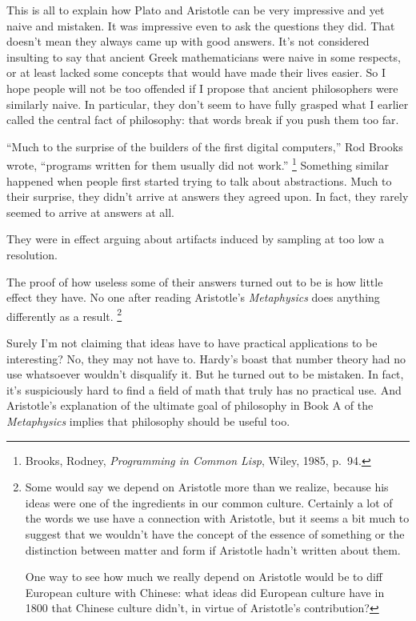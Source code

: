 \documentclass[12pt]{book}
\begin{document}
This is all to explain how Plato and Aristotle can be very impressive
and yet naive and mistaken. It was impressive even to ask the questions
they did. That doesn't mean they always came up with good answers. It's
not considered insulting to say that ancient Greek mathematicians were
naive in some respects, or at least lacked some concepts that would have
made their lives easier. So I hope people will not be too offended if I
propose that ancient philosophers were similarly naive. In particular,
they don't seem to have fully grasped what I earlier called the central
fact of philosophy: that words break if you push them too far.

``Much to the surprise of the builders of the first digital computers,''
Rod Brooks wrote, ``programs written for them usually did not work.''
\footnote{Brooks, Rodney, \emph{Programming in Common Lisp}, Wiley, 1985,
p.~94.} Something similar happened when people first
started trying to talk about abstractions. Much to their surprise, they
didn't arrive at answers they agreed upon. In fact, they rarely seemed
to arrive at answers at all.

They were in effect arguing about artifacts induced by sampling at too
low a resolution.

The proof of how useless some of their answers turned out to be is how
little effect they have. No one after reading Aristotle's
\emph{Metaphysics} does anything differently as a result.
\footnote{Some would say we depend on Aristotle more than we realize,
because his ideas were one of the ingredients in our common culture.
Certainly a lot of the words we use have a connection with Aristotle,
but it seems a bit much to suggest that we wouldn't have the concept of
the essence of something or the distinction between matter and form if
Aristotle hadn't written about them.

One way to see how much we really depend on Aristotle would be to diff
European culture with Chinese: what ideas did European culture have in
1800 that Chinese culture didn't, in virtue of Aristotle's contribution?}

Surely I'm not claiming that ideas have to have practical applications
to be interesting? No, they may not have to. Hardy's boast that number
theory had no use whatsoever wouldn't disqualify it. But he turned out
to be mistaken. In fact, it's suspiciously hard to find a field of math
that truly has no practical use. And Aristotle's explanation of the
ultimate goal of philosophy in Book A of the \emph{Metaphysics} implies
that philosophy should be useful too.
\end{document}
